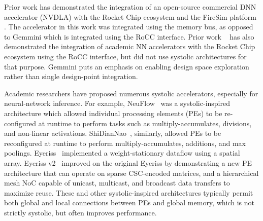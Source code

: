 Prior work has demonstrated the integration of an open-source commercial DNN accelerator (NVDLA) with the Rocket Chip ecosystem and the FireSim platform \cite{farzad2019rocketnvdla}. The accelerator in this work was integrated using the memory bus, as opposed to Gemmini which is integrated using the RoCC interface. %
Prior work ~\cite{seldridge} has also demonstrated the integration of academic NN accelerators with the Rocket Chip ecosystem using the RoCC interface, but did not use systolic architectures for that purpose.
Gemmini puts an emphasis on enabling design space exploration rather than single design-point integration.

Academic researchers have proposed numerous systolic accelerators, especially for neural-network inference. For example, NeuFlow~\cite{neuflow} was a systolic-inspired architecture which allowed individual processing elements (PEs) to be re-configured at runtime to perform tasks such as multiply-accumulates, divisions, and non-linear activations. ShiDianNao~\cite{shidiannao}, similarly, allowed PEs to be reconfigured at runtime to perform multiply-accumulates, additions, and max poolings. 
Eyeriss~\cite{eyeriss} implemented a weight-stationary dataflow using a spatial array. Eyeriss v2~\cite{eyeriss2} improved on the original Eyeriss by demonstrating a new PE architecture that can operate on sparse CSC-encoded matrices, and a hierarchical mesh NoC capable of unicast, multicast, and broadcast data transfers to maximize reuse.
These and other systolic-inspired architectures typically permit both global and local connections between PEs and global memory, which is not strictly systolic, but often improves performance.


